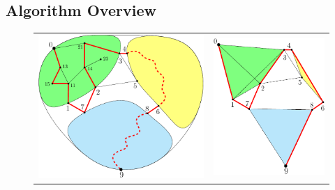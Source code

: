 \documentclass[11pt]{article}
\begin{document}
\subsection{Algorithm Overview}
\label{sec:algorithm_overview}
\begin{figure}
\centering
\begin{tabular}{cc}
\includegraphics[scale=0.75]{examplegraph}&\includegraphics[scale=0.75]{exampleauxiliary}

\end{tabular}
\end{figure}
\end{document}
